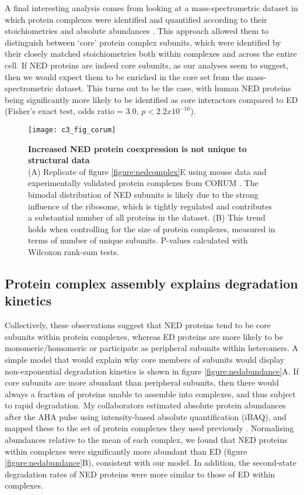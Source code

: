 \documentclass[a4paper,11pt,twoside,openright]{scrbook}
\begin{document}
A final interesting analysis comes from looking at a mass-spectrometric dataset
in which protein complexes were identified and quantified according to their
stoichiometries and absolute abundances \cite{Hein2015}. This approach allowed
them to distinguish between `core' protein complex subunits, which were
identified by their closely matched stoichiometries both within complexes and
across the entire cell. If NED proteins are indeed core subunits, as our
analyses seem to suggest, then we would expect them to be enriched in the core
set from the mass-spectrometric dataset. This turns out to be the case, with
human NED proteins being significantly more likely to be identified as core
interactors compared to ED (Fisher's exact test, odds ratio = 3.0, $p <
2.2x10^{-16}$).

\begin{figure}
    \texttt{[image: c3\_fig\_corum]}
    \caption[Increased NED protein coexpression is not unique to structural
    data]{\sffamily \textbf{Increased NED protein coexpression is not unique to
    structural data} \\ \small (A) Replicate of figure \ref{figure:nedcomplex}E
    using mouse data and experimentally validated protein complexes from CORUM
    \cite{Ruepp2009}. The bimodal distribution of NED subunits is likely due to
    the strong influence of the ribosome, which is tightly regulated and
    contributes a substantial number of all proteins in the dataset. (B) This
    trend holds when controlling for the size of protein complexes, measured in
    terms of number of unique subunits. P-values calculated with Wilcoxon
    rank-sum tests.}
    \label{figure:corum}
\end{figure}

\subsection{Protein complex assembly explains degradation kinetics}
Collectively, these observations suggest that NED proteins tend to be core
subunits within protein complexes, whereas ED proteins are more likely to be
monomeric/homomeric or participate as peripheral subunits within heteromers. A
simple model that would explain why core members of subunits would display
non-exponential degradation kinetics is shown in figure
\ref{figure:nedabundance}A. If core subunits are more abundant than peripheral
subunits, then there would always a fraction of proteins unable to assemble into
complexes, and thus subject to rapid degradation. My collaborators estimated
absolute protein abundances after the AHA pulse using intensity-based absolute
quantification \cite{Schwanhausser2011} (iBAQ), and mapped these to the set of
protein complexes they used previously \cite{Ori2016}. Normalising abundances
relative to the mean of each complex, we found that NED proteins within
complexes were significantly more abundant than ED (figure
\ref{figure:nedabundance}B), consistent with our model. In addition, the
second-state degradation rates of NED proteins were more similar to those of ED
within complexes.
\end{document}
